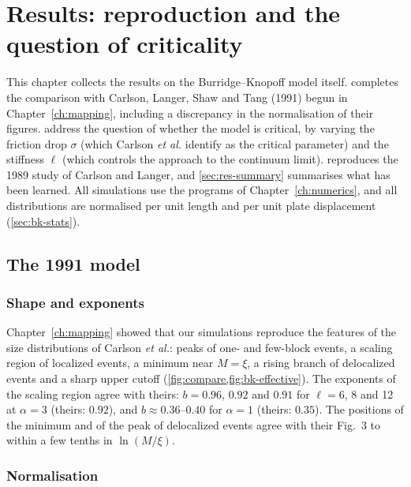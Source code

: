 \chapter{Results: reproduction and the question of criticality}
\label{ch:results}



This chapter collects the results on the Burridge--Knopoff model itself.  completes the comparison with Carlson,
Langer, Shaw and Tang (1991) begun in Chapter~\ref{ch:mapping}, including a discrepancy in the normalisation of their figures.
 address the question of whether the model is critical, by varying the friction drop $\sigma$ (which
Carlson \emph{et al.} identify as the critical parameter) and the stiffness $\ell$ (which controls the approach to the continuum limit).
 reproduces the 1989 study of Carlson and Langer, and \cref{sec:res-summary} summarises what has been learned. All
simulations use the programs of Chapter~\ref{ch:numerics}, and all distributions are normalised per unit length and per unit plate
displacement (\cref{sec:bk-stats}).

\section{The 1991 model}
\label{sec:res-1991}

\subsection{Shape and exponents}

Chapter~\ref{ch:mapping} showed that our simulations reproduce the features of the size distributions of Carlson \emph{et al.}: peaks of
one- and few-block events, a scaling region of localized events, a minimum near $M=\xi$, a rising branch of delocalized events and a sharp
upper cutoff (\cref{fig:compare,fig:bk-effective}). The exponents of the scaling region agree with theirs: $b = 0.96$, $0.92$ and $0.91$ for
$\ell = 6$, 8 and 12 at $\alpha = 3$ (theirs: $0.92$), and $b\approx0.36$--$0.40$ for $\alpha = 1$ (theirs: $0.35$). The positions of the
minimum and of the peak of delocalized events agree with their Fig.~3 to within a few tenths in $\ln(M/\xi)$.

\subsection{Normalisation}

